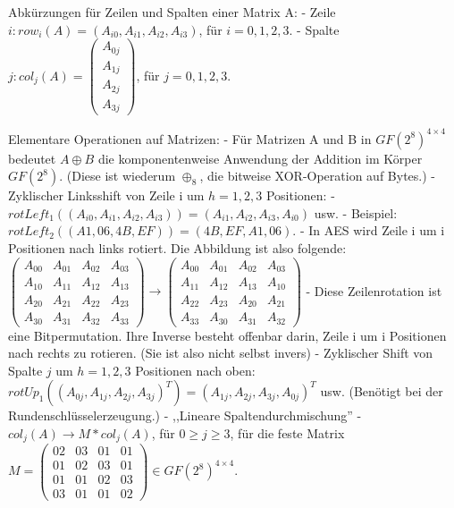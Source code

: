 \documentclass[a4paper]{article}
\begin{document}
\begin{multicols}{3}
    Abkürzungen für Zeilen und Spalten einer Matrix A:
    - Zeile $i: row_i(A)=(A_{i0},A_{i1},A_{i2} ,A_{i3})$, für $i=0,1,2,3$.
    - Spalte $j:col_j(A)=\begin{pmatrix} A_{0j}\\ A_{1j}\\ A_{2j}\\ A_{3j} \end{pmatrix}$, für $j=0,1,2,3$.

    Elementare Operationen auf Matrizen:
    - Für Matrizen A und B in $GF(2^8)^{4\times 4}$ bedeutet $A\oplus B$ die komponentenweise Anwendung der Addition im Körper $GF(2^8)$. (Diese ist wiederum $\oplus_8$, die bitweise XOR-Operation auf Bytes.)
    - Zyklischer Linksshift von Zeile i um $h=1,2,3$ Positionen:
    - $rotLeft_1((A_{i0}, A_{i1}, A_{i2}, A_{i3})) =(A_{i1}, A_{i2}, A_{i3}, A_{i0})$ usw.
    - Beispiel: $rotLeft_2((A1,06,4B,EF)) = (4B,EF,A1,06)$.
    - In AES wird Zeile i um i Positionen nach links rotiert. Die Abbildung ist also folgende: $\begin{pmatrix} A_{00}& A_{01}& A_ {02}& A_{03}\\ A_{10}& A_{11}& A_{12}& A_{13}\\ A_{20}& A_{21}& A_{22}& A_{23}\\ A_{30}& A_{31}& A_{32}& A_{33}\end{pmatrix} \rightarrow \begin{pmatrix} A_{00}& A_{01}& A_{02}& A_{03}\\ A_{11}& A_{12}& A_{13}& A_{10}\\ A_{22}& A_{23}& A_{20}& A_{21}\\ A_{33}& A_{30}& A_{31}& A_{32}\end{pmatrix}$
    - Diese Zeilenrotation ist eine Bitpermutation. Ihre Inverse besteht offenbar darin, Zeile i um i Positionen nach rechts zu rotieren. (Sie ist also nicht selbst invers)
    - Zyklischer Shift von Spalte $j$ um $h=1,2,3$ Positionen nach oben: $rotUp_1((A_{0j},A_{1j},A_{2j},A_{3j})^T) = (A_{1j},A_{2j},A_{3j},A_{0j})^T$ usw. (Benötigt bei der Rundenschlüsselerzeugung.)
    -  ,,Lineare Spaltendurchmischung''
    - $col_j(A) \rightarrow M*col_j(A)$, für $0\geq j\geq 3$, für die feste Matrix $M=\begin{pmatrix} 02& 03& 01& 01\\ 01& 02& 03& 01\\ 01& 01& 02& 03\\ 03& 01& 01& 02\end{pmatrix}\in GF(2^8)^{4\times 4}$.


\end{multicols}
\end{document}
